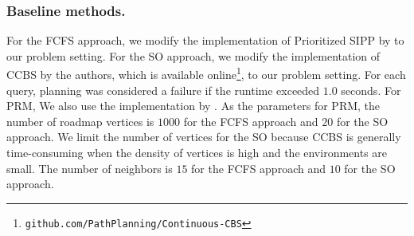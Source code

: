 \documentclass[letterpaper]{article} %
\begin{document}
\subsubsection{Baseline methods.}
For the FCFS approach, we modify the implementation of Prioritized SIPP by \citet{kasaura2022prioritized} to our problem setting. For the SO approach, we modify the implementation of CCBS by the authors, which is available online\footnote{\texttt{github.com/PathPlanning/Continuous-CBS}}, to our problem setting.
For each query, planning was considered a failure if the runtime exceeded $1.0$ seconds.
For PRM, We also use the implementation by \citet{kasaura2022prioritized}. 
As the parameters for PRM,  the number of roadmap vertices is $1000$ for the FCFS approach and $20$ for the SO approach. We limit the number of vertices for the SO because CCBS is generally time-consuming when the density of vertices is high and the environments are small. The number of neighbors is $15$ for the FCFS approach and $10$ for the SO approach.

\clearpage


\end{document}
